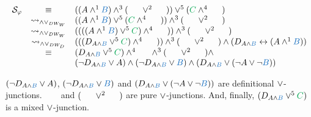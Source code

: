 \documentclass{llncs}
\begin{document}
\begin{example}
$$
\begin{array}{rcl}
\cutpertstruct{\varphi} 
& \equiv &
((\hA{A} \structplus^1 \hB{B}) \structplus^3 (\hC{\structdual{B}} \structtimes^2 \hD{\structdual{A}}))
\structtimes^5
(\hE{C} \structplus^4 \hF{\structdual{C}}) \\
%
& \normalizePlusTimesDWw &
	((\hA{A} \structplus^1 \hB{B})\structtimes^5 (\hE{C} \structplus^4 \hF{\structdual{C}}))
\structplus^3 
	(\hC{\structdual{B}} \structtimes^2 \hD{\structdual{A}}) \\
%
& \normalizePlusTimesDWw &
	((((\hA{A} \structplus^1 \hB{B})\structtimes^5 \hE{C}) \structplus^4 \hF{\structdual{C}}))
\structplus^3 
	(\hC{\structdual{B}} \structtimes^2 \hD{\structdual{A}}) \\
%
& \normalizePlusTimesDWd &
	(((D_{\hA{A} \structplus \hB{B}} \structtimes^5 \hE{C}) \structplus^4 \hF{\structdual{C}}))
\structplus^3 
	(\hC{\structdual{B}} \structtimes^2 \hD{\structdual{A}}) 
\structplus
(D_{\hA{A} \structplus \hB{B}} \biimp (\hA{A} \structplus^1 \hB{B})) \\
%
& \equiv &
	(D_{\hA{A} \structplus \hB{B}} \structtimes^5 \hE{C}) 
\structplus^4 
	\hF{\structdual{C}}
\structplus^3 
	(\hC{\structdual{B}} \structtimes^2 \hD{\structdual{A}}) 
\structplus \\
&		   &	
	(\neg D_{\hA{A} \structplus \hB{B}} \structtimes \hA{A} ) 
\structplus
	(\neg D_{\hA{A} \structplus \hB{B}} \structtimes \hB{B} )
\structplus
	(D_{\hA{A} \structplus \hB{B}} \structtimes (\neg \hA{A} \structtimes \neg \hB{B})) \\
\end{array}
$$

$(\neg D_{\hA{A} \structplus \hB{B}} \structtimes \hA{A} )$, $(\neg D_{\hA{A} \structplus \hB{B}} \structtimes \hB{B} )$ and $(D_{\hA{A} \structplus \hB{B}} \structtimes (\neg \hA{A} \structtimes \neg \hB{B}))$ are definitional $\vee$-junctions. $\hF{\structdual{C}}$ and $(\hC{\structdual{B}} \structtimes^2 \hD{\structdual{A}})$ are pure $\vee$-junctions. And, finally, $(D_{\hA{A} \structplus \hB{B}} \structtimes^5 \hE{C})$ is a mixed $\vee$-junction.
\end{example}
\end{document}
